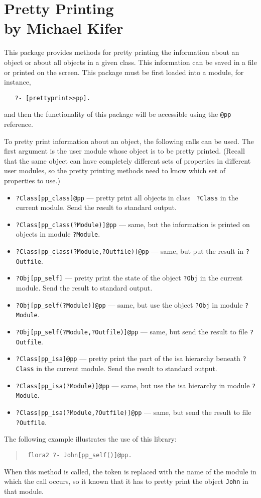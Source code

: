 \chapter[Pretty Printing]{Pretty Printing\\{\Large by Michael Kifer}}


This package provides methods for pretty printing the information about an
object or about all objects in a given class. This information can be saved
in a file or printed on the screen. This package must be first loaded into
a module, for instance, 
\begin{verbatim}
   ?- [prettyprint>>pp].
\end{verbatim}
and then the functionality of this package will be
accessible using the {\tt @pp} reference.

To pretty print information about an object, the following calls can be
used.  The first argument is the user module whose object is to be pretty
printed. (Recall that the same object can have completely different sets of
properties in different user modules, so the pretty printing methods need to
know which set of properties to use.)
\begin{itemize}
\item {\tt ?Class[pp\_class]@pp} --- pretty print all objects in class {\tt
  ?Class} in the current module. Send the result to standard output.
\item {\tt ?Class[pp\_class(?Module)]@pp} --- same, but the information is
  printed on objects in module {\tt ?Module}. 
\item  {\tt ?Class[pp\_class(?Module,?Outfile)]@pp} --- same, but
  put the result in {\tt ?Outfile}.
\item {\tt ?Obj[pp\_self]} --- pretty print the state of the object {\tt ?Obj}
  in the current module. Send the result to standard output.
\item {\tt ?Obj[pp\_self(?Module)]@pp} --- same, but use the object {\tt ?Obj}
  in module {\tt ?Module}.  
\item {\tt ?Obj[pp\_self(?Module,?Outfile)]@pp} --- same, but send the result 
  to file {\tt ?Outfile}. 
\item {\tt ?Class[pp\_isa]@pp} --- pretty print the part of the isa
  hierarchy beneath {\tt ?Class} in the current module. Send the result to
  standard output.
\item {\tt ?Class[pp\_isa(?Module)]@pp} --- same, but use the isa hierarchy in
  module {\tt ?Module}. 
\item {\tt ?Class[pp\_isa(?Module,?Outfile)]@pp} --- same, but send the result
  to file {\tt ?Outfile}.
\end{itemize}
The following example illustrates the use of this library:
\begin{quote}
 {\tt
  flora2 ?- John[pp\_self(\thismodule)]@pp.
   }
\end{quote}
When this method is called, the token \thismodule is replaced with the name
of the module in which the call occurs, so it known that it has to pretty
print the object {\tt John} in that module.



